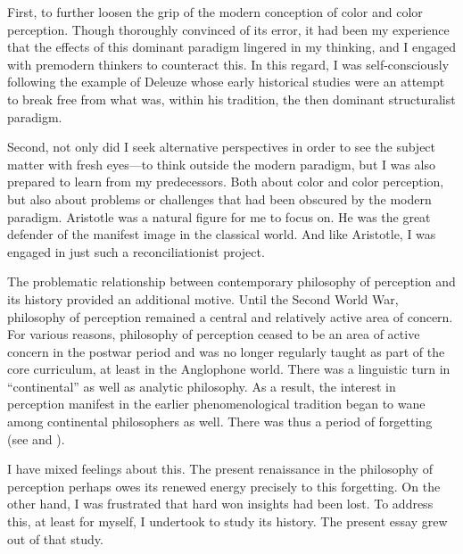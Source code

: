 First, to further loosen the grip of the modern conception of color and color perception. Though thoroughly convinced of its error, it had been my experience that the effects of this dominant paradigm lingered in my thinking, and I engaged with premodern thinkers to counteract this. In this regard, I was self-consciously following the example of Deleuze whose early historical studies were an attempt to break free from what was, within his tradition, the then dominant structuralist paradigm.

Second, not only did I seek alternative perspectives in order to see the subject matter with fresh eyes---to think outside the modern paradigm, but I was also prepared to learn from my predecessors. Both about color and color perception, but also about problems or challenges that had been obscured by the modern paradigm. Aristotle was a natural figure for me to focus on. He was the great defender of the manifest image in the classical world. And like Aristotle, I was engaged in just such a reconciliationist project.

The problematic relationship between contemporary philosophy of perception and its history provided an additional motive. Until the Second World War, philosophy of perception remained a central and relatively active area of concern. For various reasons, philosophy of perception ceased to be an area of active concern in the postwar period and was no longer regularly taught as part of the core curriculum, at least in the Anglophone world. There was a linguistic turn in ``continental'' as well as analytic philosophy. As a result, the interest in perception manifest in the earlier phenomenological tradition began to wane among continental philosophers as well. There was thus a period of forgetting (see \citealt[first lecture]{Putnam:1994kx} and \citealt[xvii]{Burge:2010uq}).

I have mixed feelings about this. The present renaissance in the philosophy of perception perhaps owes its renewed energy precisely to this forgetting. On the other hand, I was frustrated that hard won insights had been lost. To address this, at least for myself, I undertook to study its history. The present essay grew out of that study.

